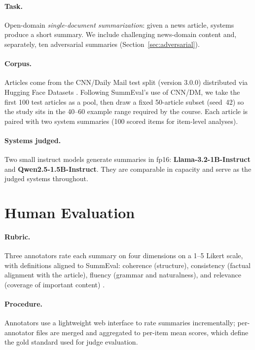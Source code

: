 \documentclass[11pt]{article}
\begin{document}
\paragraph{Task.}
Open-domain \emph{single-document summarization}: given a news article, systems produce a short summary. We include challenging news-domain content and, separately, ten adversarial summaries (Section~\ref{sec:adversarial}).

\paragraph{Corpus.}
Articles come from the CNN/Daily Mail test split (version 3.0.0) distributed via Hugging Face Datasets \citep{hermann2015teaching}. Following SummEval's use of CNN/DM, we take the first 100 test articles as a pool, then draw a fixed 50-article subset (seed~42) so the study sits in the 40--60 example range required by the course. Each article is paired with two system summaries (100 scored items for item-level analyses).

\paragraph{Systems judged.}
Two small instruct models generate summaries in fp16: \textbf{Llama-3.2-1B-Instruct} and \textbf{Qwen2.5-1.5B-Instruct}. They are comparable in capacity and serve as the judged systems throughout.

\section{Human Evaluation}

\paragraph{Rubric.}
Three annotators rate each summary on four dimensions on a 1--5 Likert scale, with definitions aligned to SummEval: coherence (structure), consistency (factual alignment with the article), fluency (grammar and naturalness), and relevance (coverage of important content) \citep{fabbri2021summeval}.

\paragraph{Procedure.}
Annotators use a lightweight web interface to rate summaries incrementally; per-annotator files are merged and aggregated to per-item mean scores, which define the gold standard used for judge evaluation.
\end{document}
